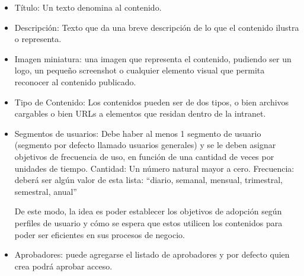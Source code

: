 \begin{itemize}
\item Título: Un texto denomina al contenido.
\item Descripción: Texto que da una breve descripción de lo que el contenido ilustra o representa.
\item Imagen miniatura: una imagen que representa el contenido, pudiendo ser un logo, un pequeño screenshot o cualquier elemento visual que permita reconocer al contenido publicado.
\item Tipo de Contenido: Los contenidos pueden ser de dos tipos, o bien archivos cargables o bien URLs a elementos que residan dentro de la intranet.
\item Segmentos de usuarios: Debe haber al menos 1 segmento de usuario (segmento por defecto llamado usuarios generales) y se le deben asignar objetivos de frecuencia de uso, en función de una cantidad de veces por unidades de tiempo. 
    Cantidad: Un número natural mayor a cero.
	Frecuencia: deberá ser algún valor de esta lista: “diario, semanal, mensual, trimestral, semestral, anual”

	De este modo, la idea es poder establecer los objetivos de adopción según perfiles de usuario y cómo se espera que estos utilicen los contenidos para poder ser eficientes en sus procesos de negocio.

\item Aprobadores: puede agregarse el listado de aprobadores y por defecto quien crea podrá aprobar acceso.


\end{itemize}
